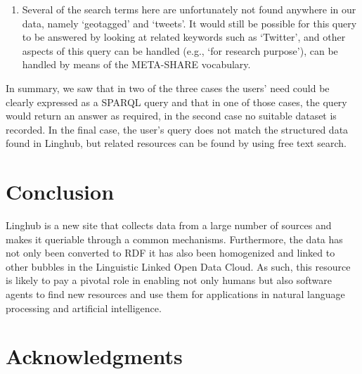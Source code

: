 \documentclass{acm_proc_article-sp}
\begin{document}
\begin{enumerate}
\item {}

Several of the search terms here are unfortunately not found anywhere in our
data, namely `geotagged' and `tweets'. It would still be possible for this query
to be answered by looking at related keywords such as `Twitter', and other
aspects of this query can be handled (e.g., `for research purpose'), can be
handled by means of the META-SHARE vocabulary.

\end{enumerate}

In summary, we saw that in two of the three cases the users' need could be
clearly expressed as a SPARQL query and that in one of those cases, the query
would return an answer as required, in the second case no suitable dataset is
recorded. In the final case, the user's query does not match the structured data
found in Linghub, but related resources can be found by using free text search.


\section{Conclusion}

\label{sec:conclusion}

Linghub is a new site that collects data from a large number of sources and
makes it queriable through a common mechanisms. Furthermore, the data has not
only been converted to RDF it has also been homogenized and linked to other
bubbles in the Linguistic Linked Open Data Cloud. As such, this resource is
likely to pay a pivotal role in enabling not only humans but also software
agents to find new resources and use them for applications in natural language
processing and artificial intelligence.

\section*{Acknowledgments}
\end{document}
